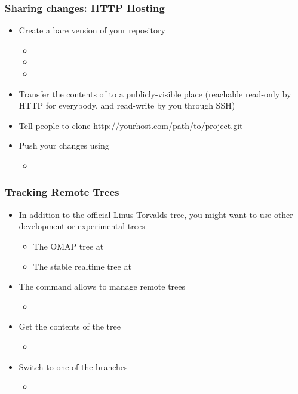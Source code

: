 \begin{frame}
  \frametitle{Sharing changes: HTTP Hosting}
  \begin{itemize}
  \item Create a bare version of your repository
    \begin{itemize}
    \item {}
    \item {}
    \item {}
    \end{itemize}
  \item Transfer the contents of  to a
    publicly-visible place (reachable read-only by HTTP for everybody,
    and read-write by you through SSH)
  \item Tell people to clone
    \url{http://yourhost.com/path/to/project.git}
  \item Push your changes using
    \begin{itemize}
    \item
    \end{itemize}
  \end{itemize}
\end{frame}

\begin{frame}
  \frametitle{Tracking Remote Trees}
  \begin{itemize}
  \item In addition to the official Linus Torvalds tree, you might
    want to use other development or experimental trees
    \begin{itemize}
    \item The OMAP tree at
    \item The stable realtime tree at
    \end{itemize}
  \item The  command allows to manage remote trees
    \begin{itemize}
    \item
    \end{itemize}
  \item Get the contents of the tree
    \begin{itemize}
    \item {}
    \end{itemize}
  \item Switch to one of the branches
    \begin{itemize}
    \item {}
    \end{itemize}
  \end{itemize}
\end{frame}


